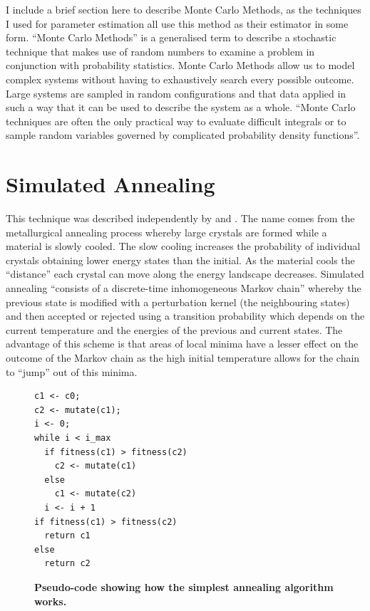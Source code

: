 I include a brief section here to describe Monte Carlo Methods, as the techniques I used for parameter estimation all use this method as their estimator in some form.
``Monte Carlo Methods'' is a generalised term to describe a stochastic technique that makes use of random numbers to examine a problem in conjunction with probability statistics. Monte Carlo Methods allow us to model complex systems without having to exhaustively search every possible outcome. Large systems are sampled in random configurations and that data applied in such a way that it can be used to describe the system as a whole. ``Monte Carlo techniques are often the only practical way to evaluate difficult integrals or to sample random variables governed by complicated probability density functions''\cite{Nakamura2010}.

\section{Simulated Annealing}

This technique was described independently by \citet{Kirkpatrick1983} and \citet{Cerny1985}. The name comes from the metallurgical annealing process whereby large crystals are formed while a material is slowly cooled. The slow cooling increases the probability of individual crystals obtaining lower energy states than the initial. As the material cools the ``distance'' each crystal can move along the energy landscape decreases.
Simulated annealing ``consists of a discrete-time inhomogeneous Markov chain''\cite{Bertsimas1993} whereby the previous state is modified with a perturbation kernel (the neighbouring states) and then accepted or rejected using a transition probability which depends on the current temperature and the energies of the previous and current states. The advantage of this scheme is that areas of local minima have a lesser effect on the outcome of the Markov chain as the high initial temperature allows for the chain to ``jump'' out of this minima.

\begin{figure}[tbp]
\small
\begin{verbatim}
c1 <- c0;
c2 <- mutate(c1);
i <- 0;
while i < i_max
  if fitness(c1) > fitness(c2)
    c2 <- mutate(c1)
  else
    c1 <- mutate(c2)
  i <- i + 1
if fitness(c1) > fitness(c2)
  return c1
else
  return c2
\end{verbatim}
\caption[Pseudo-code showing how the simplest annealing algorithm works.]{{\bf Pseudo-code showing how the simplest annealing algorithm works.}
\label{fig:sa_code}}
\end{figure}

